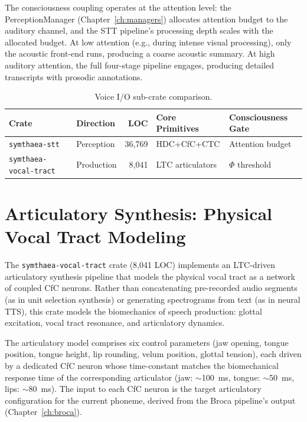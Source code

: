 \documentclass[12pt]{book}
\begin{document}
The consciousness coupling operates at the attention level: the PerceptionManager (Chapter~\ref{ch:managers}) allocates attention budget to the auditory channel, and the STT pipeline's processing depth scales with the allocated budget. At low attention (e.g., during intense visual processing), only the acoustic front-end runs, producing a coarse acoustic summary. At high auditory attention, the full four-stage pipeline engages, producing detailed transcripts with prosodic annotations.

\begin{table}[htbp]
\centering
\caption{Voice I/O sub-crate comparison.}
\label{tab:voice-crates}
\begin{tabular}{llrll}
\toprule
\textbf{Crate} & \textbf{Direction} & \textbf{LOC} & \textbf{Core Primitives} & \textbf{Consciousness Gate} \\
\midrule
\texttt{symthaea-stt} & Perception & 36,769 & HDC+CfC+CTC & Attention budget \\
\texttt{symthaea-vocal-tract} & Production & 8,041 & LTC articulators & $\Phi$ threshold \\
\bottomrule
\end{tabular}
\end{table}

\section{Articulatory Synthesis: Physical Vocal Tract Modeling}

The \texttt{symthaea-vocal-tract} crate (8,041 LOC) implements an LTC-driven articulatory synthesis pipeline that models the physical vocal tract as a network of coupled CfC neurons. Rather than concatenating pre-recorded audio segments (as in unit selection synthesis) or generating spectrograms from text (as in neural TTS), this crate models the biomechanics of speech production: glottal excitation, vocal tract resonance, and articulatory dynamics.

The articulatory model comprises six control parameters (jaw opening, tongue position, tongue height, lip rounding, velum position, glottal tension), each driven by a dedicated CfC neuron whose time-constant matches the biomechanical response time of the corresponding articulator (jaw: $\sim$100~ms, tongue: $\sim$50~ms, lips: $\sim$80~ms). The input to each CfC neuron is the target articulatory configuration for the current phoneme, derived from the Broca pipeline's output (Chapter~\ref{ch:broca}).
\end{document}
